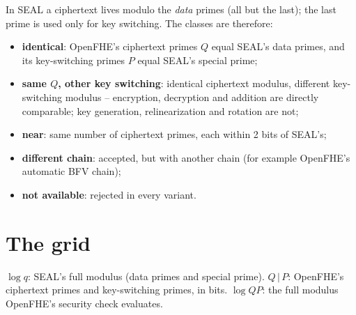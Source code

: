 \documentclass[11pt]{article}
\begin{document}
In SEAL a ciphertext lives modulo the \emph{data} primes (all but the last); the last prime is used only for key switching. The classes are therefore:
\begin{itemize}[leftmargin=*, itemsep=1pt]
  \item \textbf{identical}: OpenFHE's ciphertext primes $Q$ equal SEAL's data primes, and its key-switching primes $P$ equal SEAL's special prime;
  \item \textbf{same $Q$, other key switching}: identical ciphertext modulus, different key-switching modulus -- encryption, decryption and addition are directly comparable; key generation, relinearization and rotation are not;
  \item \textbf{near}: same number of ciphertext primes, each within 2 bits of SEAL's;
  \item \textbf{different chain}: accepted, but with another chain (for example OpenFHE's automatic BFV chain);
  \item \textbf{not available}: rejected in every variant.
\end{itemize}

\section{The grid}

{\footnotesize\setlength{\tabcolsep}{3pt}
}

\noindent $\log q$: SEAL's full modulus (data primes and special prime). $Q\,|\,P$: OpenFHE's ciphertext primes and key-switching primes, in bits. $\log QP$: the full modulus OpenFHE's security check evaluates.
\end{document}
